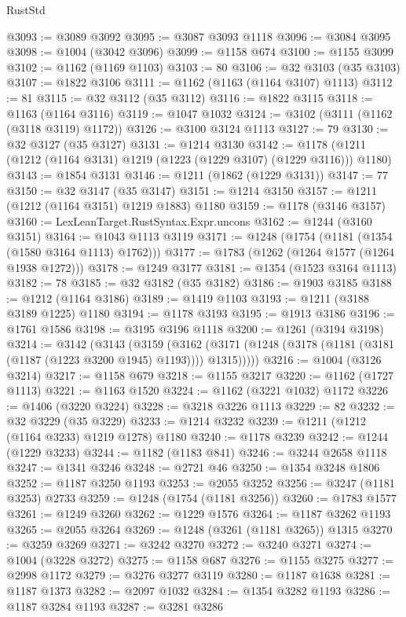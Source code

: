 \begin{lexlean}{RustStd}
\begin{coremodule}
@3093 := @3089 @3092
@3095 := @3087 @3093 @1118
@3096 := @3084 @3095
@3098 := @1004 (@3042 @3096)
@3099 := @1158 @674
@3100 := @1155 @3099
@3102 := @1162 (@1169 @1103)
@3103 := 80
@3106 := @32 @3103 (@35 @3103)
@3107 := @1822 @3106
@3111 := @1162 (@1163 (@1164 @3107) @1113)
@3112 := 81
@3115 := @32 @3112 (@35 @3112)
@3116 := @1822 @3115
@3118 := @1163 (@1164 @3116)
@3119 := @1047 @1032
@3124 := @3102 (@3111 (@1162 (@3118 @3119) @1172))
@3126 := @3100 @3124 @1113
@3127 := 79
@3130 := @32 @3127 (@35 @3127)
@3131 := @1214 @3130
@3142 := @1178 (@1211 (@1212 (@1164 @3131) @1219 (@1223 (@1229 @3107) (@1229 @3116))) @1180)
@3143 := @1854 @3131
@3146 := @1211 (@1862 (@1229 @3131))
@3147 := 77
@3150 := @32 @3147 (@35 @3147)
@3151 := @1214 @3150
@3157 := @1211 (@1212 (@1164 @3151) @1219 @1883) @1180
@3159 := @1178 (@3146 @3157)
@3160 := LexLeanTarget.RustSyntax.Expr.uncons
@3162 := @1244 (@3160 @3151)
@3164 := @1043 @1113 @3119
@3171 := @1248 (@1754 (@1181 (@1354 (@1580 @3164 @1113) @1762)))
@3177 := @1783 (@1262 (@1264 @1577 (@1264 @1938 @1272)))
@3178 := @1249 @3177
@3181 := @1354 (@1523 @3164 @1113)
@3182 := 78
@3185 := @32 @3182 (@35 @3182)
@3186 := @1903 @3185
@3188 := @1212 (@1164 @3186)
@3189 := @1419 @1103
@3193 := @1211 (@3188 @3189 @1225) @1180
@3194 := @1178 @3193
@3195 := @1913 @3186
@3196 := @1761 @1586
@3198 := @3195 @3196 @1118
@3200 := @1261 (@3194 @3198)
@3214 := @3142
    (@3143
      (@3159
        (@3162 (@3171 (@1248 (@3178 (@1181 (@3181 (@1187 (@1223 @3200 @1945) @1193)))) @1315)))))
@3216 := @1004 (@3126 @3214)
@3217 := @1158 @679
@3218 := @1155 @3217
@3220 := @1162 (@1727 @1113)
@3221 := @1163 @1520
@3224 := @1162 (@3221 @1032) @1172
@3226 := @1406 (@3220 @3224)
@3228 := @3218 @3226 @1113
@3229 := 82
@3232 := @32 @3229 (@35 @3229)
@3233 := @1214 @3232
@3239 := @1211 (@1212 (@1164 @3233) @1219 @1278) @1180
@3240 := @1178 @3239
@3242 := @1244 (@1229 @3233)
@3244 := @1182 (@1183 @841)
@3246 := @3244 @2658 @1118
@3247 := @1341 @3246
@3248 := @2721 @46
@3250 := @1354 @3248 @1806
@3252 := @1187 @3250 @1193
@3253 := @2055 @3252
@3256 := @3247 (@1181 @3253) @2733
@3259 := @1248 (@1754 (@1181 @3256))
@3260 := @1783 @1577
@3261 := @1249 @3260
@3262 := @1229 @1576
@3264 := @1187 @3262 @1193
@3265 := @2055 @3264
@3269 := @1248 (@3261 (@1181 @3265)) @1315
@3270 := @3259 @3269
@3271 := @3242 @3270
@3272 := @3240 @3271
@3274 := @1004 (@3228 @3272)
@3275 := @1158 @687
@3276 := @1155 @3275
@3277 := @2998 @1172
@3279 := @3276 @3277 @3119
@3280 := @1187 @1638
@3281 := @1187 @1373
@3282 := @2097 @1032
@3284 := @1354 @3282 @1193
@3286 := @1187 @3284 @1193
@3287 := @3281 @3286

\end{coremodule}
\end{lexlean}
